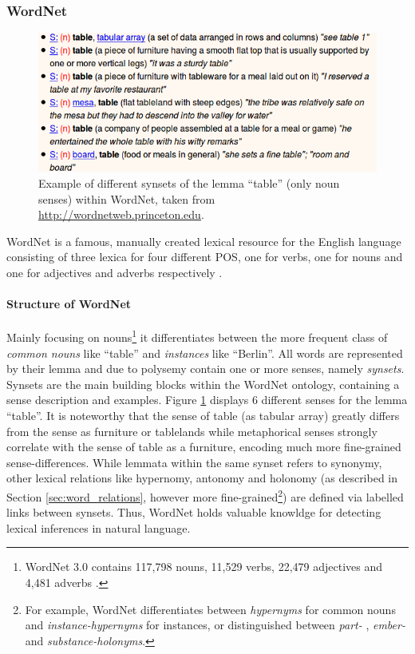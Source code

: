 \subsubsection{WordNet}\label{sec:wordnet}
\begin{figure}
\centering
	\includegraphics[totalheight=3.5cm]{fig/wordnet_example.png}
	\caption{Example of different synsets of the lemma ``table'' (only noun senses) within WordNet, taken from \href{http://wordnetweb.princeton.edu}{http://wordnetweb.princeton.edu}.}
	\label{fig:wordnet}
\end{figure}
WordNet \citep{miller1995wordnet} is a famous, manually created lexical resource for the English language consisting of three lexica for four different \ac{POS}, one for verbs, one for nouns and one for adjectives and adverbs respectively \citep{Jurafsky2008May}. 
\paragraph*{Structure of WordNet} 
Mainly focusing on nouns\footnote{WordNet 3.0 contains 117,798 nouns, 11,529 verbs, 22,479 adjectives and 4,481 adverbs \citep{Jurafsky2008May}.} it differentiates between the more frequent class of \textit{common nouns} like ``table'' and \textit{instances} like ``Berlin''. All words are represented by their lemma and due to polysemy contain one or more senses, namely \textit{synsets}. Synsets are the main building blocks within the WordNet ontology, containing a sense description and examples. Figure \ref{fig:wordnet} displays 6 different senses for the lemma ``table''. It is noteworthy that the sense of table (as tabular array) greatly differs from the sense as furniture or tablelands while metaphorical senses strongly correlate with the sense of table as a furniture, encoding much more fine-grained sense-differences. While lemmata within the same synset refers to synonymy, other lexical relations like hypernomy, antonomy and holonomy (as described in Section \ref{sec:word_relations}, however more fine-grained\footnote{For example,  WordNet differentiates between \textit{hypernyms} for common nouns and \textit{instance-hypernyms} for instances, or distinguished between \textit{part- }, \textit{ember-} and \textit{substance-holonyms}.}) are defined via labelled links between synsets. Thus, WordNet holds valuable knowldge for detecting lexical inferences in natural language.

